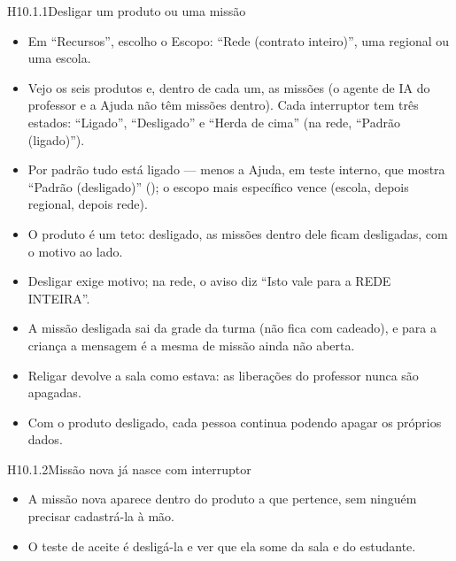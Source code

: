 
\begin{historia}{H10.1.1}{Desligar um produto ou uma missão}{\pronto}
\aceite
\begin{itemize}
  \item Em \enquote{Recursos}, escolho o Escopo: \enquote{Rede (contrato
    inteiro)}, uma regional ou uma escola.
  \item Vejo os seis produtos e, dentro de cada um, as missões (o agente de IA
    do professor e a Ajuda não têm missões dentro). Cada
    interruptor tem três estados: \enquote{Ligado}, \enquote{Desligado} e
    \enquote{Herda de cima} (na rede, \enquote{Padrão (ligado)}).
  \item Por padrão tudo está ligado --- menos a Ajuda, em teste interno, que
    mostra \enquote{Padrão (desligado)} (); o escopo mais
    específico vence (escola, depois regional, depois rede).
  \item O produto é um teto: desligado, as missões dentro dele ficam
    desligadas, com o motivo ao lado.
  \item Desligar exige motivo; na rede, o aviso diz \enquote{Isto vale para a
    REDE INTEIRA}.
  \item A missão desligada sai da grade da turma (não fica com cadeado), e
    para a criança a mensagem é a mesma de missão ainda não aberta.
  \item Religar devolve a sala como estava: as liberações do professor nunca
    são apagadas.
  \item Com o produto desligado, cada pessoa continua podendo apagar os
    próprios dados.
\end{itemize}
\end{historia}

\begin{historia}{H10.1.2}{Missão nova já nasce com interruptor}{\pronto}
\aceite
\begin{itemize}
  \item A missão nova aparece dentro do produto a que pertence, sem ninguém
    precisar cadastrá-la à mão.
  \item O teste de aceite é desligá-la e ver que ela some da sala e do
    estudante.
\end{itemize}
\end{historia}


